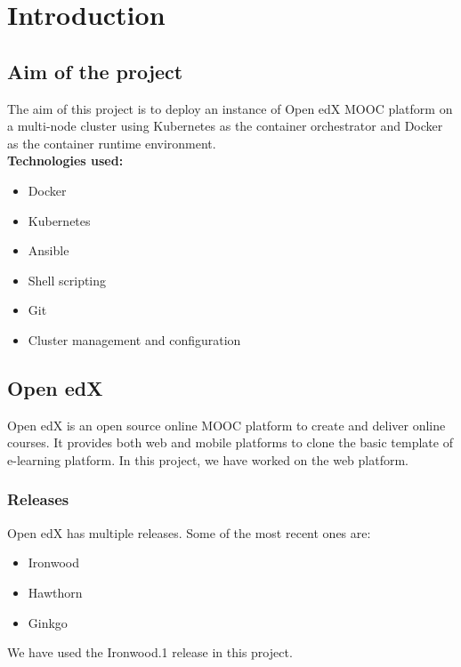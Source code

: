 \documentclass[12pt]{report}
\begin{document}
\chapter{Introduction}
\section{Aim of the project}

The aim of this project is to deploy an instance of Open edX MOOC platform on a multi-node cluster using Kubernetes as the container orchestrator and Docker as the container runtime environment. \\

\textbf{Technologies used:}
\begin{itemize}
	\item Docker
	\item Kubernetes
	\item Ansible
	\item Shell scripting
	\item Git
	\item Cluster management and configuration
\end{itemize}



\section{Open edX}
Open edX is an open source online MOOC platform to create and deliver online courses. It provides both web and mobile platforms to clone the basic template of e-learning platform. In this project, we have worked on the web platform.

\subsection{Releases}
Open edX has multiple releases. Some of the most recent ones are:
\begin{itemize}
	\item Ironwood
	\item Hawthorn
	\item Ginkgo
\end{itemize}
We have used the Ironwood.1 release in this project.
\end{document}
